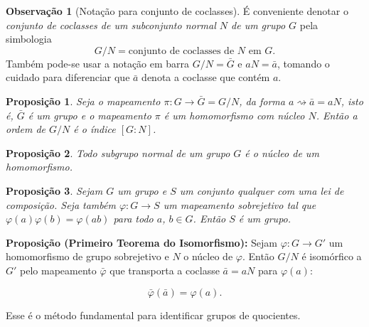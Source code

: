 \documentclass[a4paper,12pt]{report}
\theoremstyle{plain}
\newtheorem{proposicao}{Proposição}[section]
\theoremstyle{definition}
\newtheorem{observacao}{Observação}[section]
\begin{document}
\begin{observacao}[Notação para conjunto de coclasses]
	É conveniente denotar o \emph{conjunto de coclasses de um subconjunto normal \(N\) de um grupo \(G\)} pela simbologia \[G/N = \text{conjunto de coclasses de }N\text{ em }G.\] Também pode-se	usar a notação em barra \(G/N = \bar G\) e \(aN = \bar a\), tomando o
	cuidado para diferenciar que \(\bar a\) denota a coclasse que contém
	\(a\).	
\end{observacao}

\begin{proposicao}
	Seja o mapeamento \(\pi: G \longrightarrow \bar G = G/N\), da forma
	\(a \rightsquigarrow \bar a = aN\), isto é, \(\bar G\) é um grupo e o
	mapeamento \(\pi\) é um homomorfismo com núcleo \(N\). Então a ordem de
	\(G/N\) é o índice \([G:N]\).	
\end{proposicao}

\begin{proposicao}
	Todo subgrupo normal de um grupo \(G\) é o núcleo
	de um homomorfismo.	
\end{proposicao}

\begin{proposicao}
	Sejam \(G\) um grupo e \(S\) um conjunto qualquer
	com uma lei de composição. Seja também \(\varphi:G\longrightarrow S\) um
	mapeamento sobrejetivo tal que \(\varphi(a)\varphi(b) = \varphi(ab)\)
	para todo \(a\), \(b\in G\). Então \(S\) é um grupo.	
\end{proposicao}

\textbf{Proposição (Primeiro Teorema do Isomorfismo):} Sejam
\(\varphi:G \longrightarrow G'\) um homomorfismo de grupo sobrejetivo e
\(N\) o núcleo de \(\varphi\). Então \(G/N\) é isomórfico a \(G'\) pelo
mapeamento \(\bar\varphi\) que transporta a coclasse \(\bar a = aN\)
para \(\varphi(a)\):

\[\bar\varphi(\bar a) = \varphi(a).\]

Esse é o método fundamental para identificar grupos de quocientes.

{}



\end{document}

